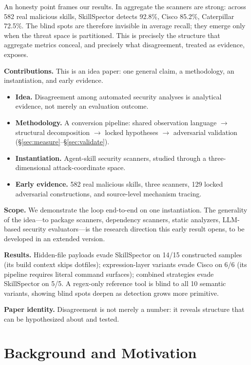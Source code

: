 \documentclass[sigconf,nonacm]{acmart}
\begin{document}
An honesty point frames our results.
In aggregate the scanners are strong: across 582 real malicious skills, SkillSpector detects 92.8\%, Cisco 85.2\%, Caterpillar 72.5\%.
The blind spots are therefore invisible in average recall; they emerge only when the threat space is partitioned.
This is precisely the structure that aggregate metrics conceal, and precisely what disagreement, treated as evidence, exposes.

\noindent\textbf{Contributions.} This is an idea paper: one general claim, a methodology, an instantiation, and early evidence.
\begin{itemize}
  \item \textbf{Idea.} Disagreement among automated security analyses is analytical evidence, not merely an evaluation outcome.
  \item \textbf{Methodology.} A conversion pipeline: shared observation language $\rightarrow$ structural decomposition $\rightarrow$ locked hypotheses $\rightarrow$ adversarial validation (\S\ref{sec:measure}--\S\ref{sec:validate}).
  \item \textbf{Instantiation.} Agent-skill security scanners, studied through a three-dimensional attack-coordinate space.
  \item \textbf{Early evidence.} 582 real malicious skills, three scanners, 129 locked adversarial constructions, and source-level mechanism tracing.
\end{itemize}

\noindent\textbf{Scope.} We demonstrate the loop end-to-end on one instantiation.
The generality of the idea---to package scanners, dependency scanners, static analyzers, LLM-based security evaluators---is the research direction this early result opens, to be developed in an extended version.

\noindent\textbf{Results.} Hidden-file payloads evade SkillSpector on 14/15 constructed samples (its build context skips dotfiles); expression-layer variants evade Cisco on 6/6 (its pipeline requires literal command surfaces); combined strategies evade SkillSpector on 5/5.
A regex-only reference tool is blind to all 10 semantic variants, showing blind spots deepen as detection grows more primitive.

\noindent\textbf{Paper identity.} Disagreement is not merely a number: it reveals structure that can be hypothesized about and tested.

\section{Background and Motivation}
\label{sec:background}
\end{document}
